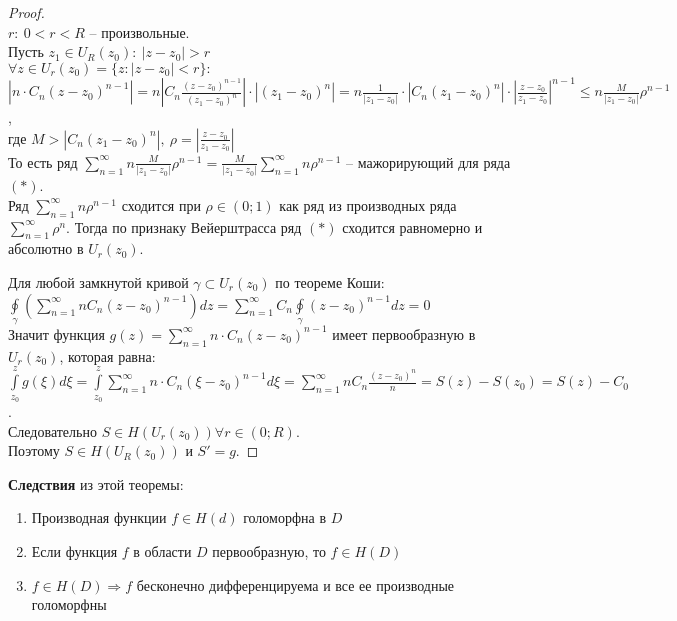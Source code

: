 \begin{proof}
    \ \\
    $r: \ 0<r<R$ -- произвольные.\\
    Пусть $z_1 \in U_R(z_0): \ |z-z_0| > r$\\
    $\forall z \in U_r(z_0) = \{z: |z-z_0|<r\}:$\\
    $|n\cdot C_n(z-z_0)^{n-1}| = n\left|C_n\frac{(z-z_0)^{n-1}}{(z_1-z_0)^n}\right|\cdot |(z_1-z_0)^n|=n\frac{1}{|z_1-z_0|}\cdot |C_n (z_1-z_0)^n|\cdot \left|\frac{z-z_0}{z_1-z_0}\right|^{n-1}\leq n\frac{M}{|z_1-z_0|}\rho^{n-1}$,\\
    где $M > |C_n (z_1-z_0)^n|, \ \rho = \left|\frac{z-z_0}{z_1-z_0}\right|$\\
    То есть ряд $\sum_{n=1}^\infty n\frac{M}{|z_1-z_0|}\rho^{n-1}=\frac{M}{|z_1-z_0|}\sum_{n=1}^\infty n\rho^{n-1}$ -- мажорирующий для ряда $(*)$.\\
    Ряд $\sum_{n=1}^\infty n\rho^{n-1}$ сходится при $\rho \in (0; 1)$ как ряд из производных ряда $\sum_{n=1}^\infty\rho^n$. Тогда по признаку Вейерштрасса ряд $(*)$ сходится равномерно и абсолютно в $U_r(z_0)$.

    Для любой замкнутой кривой $\gamma \subset U_r(z_0)$ по теореме Коши:\\
    $\oint\limits_{\gamma}\left( \sum_{n=1}^\infty n C_n (z-z_0)^{n-1} \right)dz=\sum_{n=1}^\infty C_n \oint\limits_{\gamma}(z-z_0)^{n-1}dz=0$\\
    Значит функция $g(z)=\sum_{n=1}^\infty n\cdot C_n(z-z_0)^{n-1}$ имеет первообразную в $U_r(z_0)$, которая равна:\\
    $\int\limits_{z_0}^z g(\xi)d\xi = \int\limits_{z_0}^z\sum_{n=1}^{\infty} n\cdot C_n (\xi-z_0)^{n-1}d\xi=\sum_{n=1}^{\infty} n C_n \frac{(z-z_0)^n}{n} = S(z)-S(z_0) = S(z)-C_0$.\\
    Следовательно $S \in H(U_r(z_0)) \forall r \in (0; R)$.\\
    Поэтому $S \in H(U_R(z_0))$ и $S'=g$.
\end{proof}

\textbf{Следствия} из этой теоремы:
\begin{enumerate}
    \item Производная функции $f\in H(d)$ голоморфна в $D$
    \item Если функция $f$ в области $D$ первообразную, то $f \in H(D)$
    \item $f \in H(D) \Rightarrow f$ бесконечно дифференцируема и все ее производные голоморфны
\end{enumerate}
